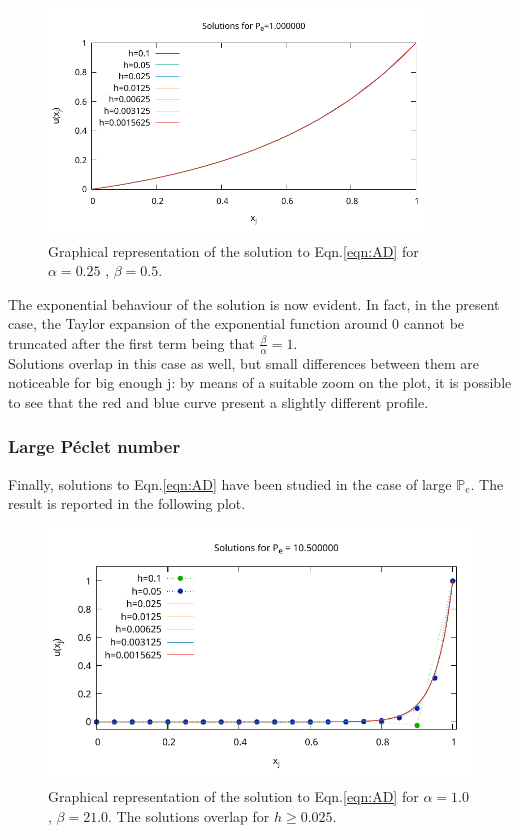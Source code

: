 \documentclass[11pt]{article}
\theoremstyle{theorem}
\theoremstyle{definition}
\begin{document}
\begin{figure}[H]
	\begin{center}
		\includegraphics[width=0.9\textwidth]{ADRsol2.pdf}
	\end{center}
	\caption{Graphical representation of the solution to Eqn.\eqref{eqn:AD} for $\alpha=0.25$ , $\beta=0.5$.
		\label{fig:P_1}}
\end{figure}

The exponential behaviour of the solution is now evident. In fact, in the present case, the Taylor expansion of the exponential function around 0 cannot be truncated after the first term being that $\frac{\beta}{\alpha}=1$.\\
Solutions overlap in this case as well, but small differences between them are noticeable for big enough j: by means of a suitable zoom on the plot, it is possible to see that the red and blue curve present a slightly different profile.\\

\subsubsection{Large P\'{e}clet number}
Finally, solutions to Eqn.\eqref{eqn:AD} have been studied in the case of large $\mathbb{P}_e$. The result is reported in the following plot.

\begin{figure}[H]
	\begin{center}
		\includegraphics[width=1.0\textwidth]{ADRsol3.pdf}
	\end{center}
	\caption{Graphical representation of the solution to Eqn.\eqref{eqn:AD} for $\alpha=1.0$ , $\beta=21.0$. The solutions overlap for $h\ge 0.025$.
		\label{fig:P_10.5}}
\end{figure}
\end{document}
